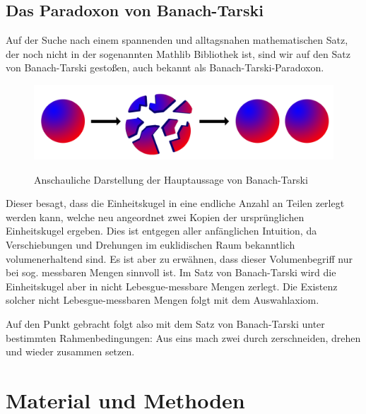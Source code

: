 \documentclass[10pt]{article}
\begin{document}
\subsection{Das Paradoxon von Banach-Tarski}\label{1.3}
Auf der Suche nach einem spannenden und alltagsnahen mathematischen Satz, der noch nicht in der sogenannten Mathlib Bibliothek ist, sind wir auf den Satz von Banach-Tarski gestoßen, auch bekannt als Banach-Tarski-Paradoxon.
\vspace*{-0.8cm}
\begin{figure}[H]
    \centering
    \includegraphics[scale=0.15]{Bild Banach Tarski.png}
    \label{Abb2}
    \caption{Anschauliche Darstellung der Hauptaussage von Banach-Tarski \cite{Q11} }
    
\end{figure}
\vspace{-0.2cm}
\noindent Dieser besagt, dass die Einheitskugel in eine endliche Anzahl an Teilen zerlegt werden kann, welche neu angeordnet zwei Kopien der ursprünglichen Einheitskugel ergeben. Dies ist entgegen aller anfänglichen Intuition, da Verschiebungen und Drehungen im euklidischen Raum bekanntlich volumenerhaltend sind. Es ist aber zu erwähnen, dass dieser Volumenbegriff nur bei sog. messbaren Mengen sinnvoll ist. Im Satz von Banach-Tarski wird die Einheitskugel aber in nicht Lebesgue-messbare Mengen zerlegt. Die Existenz solcher nicht Lebesgue-messbaren Mengen folgt mit dem Auswahlaxiom.

\noindent Auf den Punkt gebracht folgt also mit dem Satz von Banach-Tarski unter bestimmten Rahmenbedingungen: \glqq Aus eins mach zwei durch zerschneiden, drehen und wieder zusammen setzen\grqq.

\section{Material und Methoden}
\end{document}

